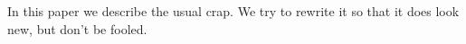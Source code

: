 In this paper we describe the usual crap. We try to rewrite it so that it does look new, but don't be fooled.

